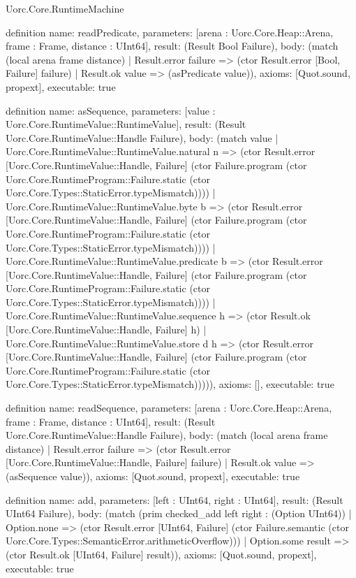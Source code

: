\begin{lexlean}{Uorc.Core.RuntimeMachine}
\begin{semanticmodule}
definition{
  name: readPredicate,
  parameters: [arena : Uorc.Core.Heap::Arena, frame : Frame, distance : UInt64],
  result: (Result Bool Failure),
  body: (match (local arena frame distance)
    | Result.error failure => (ctor Result.error [Bool, Failure] failure)
    | Result.ok value => (asPredicate value)),
  axioms: [Quot.sound, propext],
  executable: true
}

definition{
  name: asSequence,
  parameters: [value : Uorc.Core.RuntimeValue::RuntimeValue],
  result: (Result Uorc.Core.RuntimeValue::Handle Failure),
  body: (match value
    | Uorc.Core.RuntimeValue::RuntimeValue.natural n => (ctor Result.error [Uorc.Core.RuntimeValue::Handle, Failure] (ctor Failure.program (ctor Uorc.Core.RuntimeProgram::Failure.static (ctor Uorc.Core.Types::StaticError.typeMismatch))))
    | Uorc.Core.RuntimeValue::RuntimeValue.byte b => (ctor Result.error [Uorc.Core.RuntimeValue::Handle, Failure] (ctor Failure.program (ctor Uorc.Core.RuntimeProgram::Failure.static (ctor Uorc.Core.Types::StaticError.typeMismatch))))
    | Uorc.Core.RuntimeValue::RuntimeValue.predicate b => (ctor Result.error [Uorc.Core.RuntimeValue::Handle, Failure] (ctor Failure.program (ctor Uorc.Core.RuntimeProgram::Failure.static (ctor Uorc.Core.Types::StaticError.typeMismatch))))
    | Uorc.Core.RuntimeValue::RuntimeValue.sequence h => (ctor Result.ok [Uorc.Core.RuntimeValue::Handle, Failure] h)
    | Uorc.Core.RuntimeValue::RuntimeValue.store d h => (ctor Result.error [Uorc.Core.RuntimeValue::Handle, Failure] (ctor Failure.program (ctor Uorc.Core.RuntimeProgram::Failure.static (ctor Uorc.Core.Types::StaticError.typeMismatch))))),
  axioms: [],
  executable: true
}

definition{
  name: readSequence,
  parameters: [arena : Uorc.Core.Heap::Arena, frame : Frame, distance : UInt64],
  result: (Result Uorc.Core.RuntimeValue::Handle Failure),
  body: (match (local arena frame distance)
    | Result.error failure => (ctor Result.error [Uorc.Core.RuntimeValue::Handle, Failure] failure)
    | Result.ok value => (asSequence value)),
  axioms: [Quot.sound, propext],
  executable: true
}

definition{
  name: add,
  parameters: [left : UInt64, right : UInt64],
  result: (Result UInt64 Failure),
  body: (match (prim checked_add left right : (Option UInt64))
    | Option.none => (ctor Result.error [UInt64, Failure] (ctor Failure.semantic (ctor Uorc.Core.Types::SemanticError.arithmeticOverflow)))
    | Option.some result => (ctor Result.ok [UInt64, Failure] result)),
  axioms: [Quot.sound, propext],
  executable: true
}


\end{semanticmodule}
\end{lexlean}

